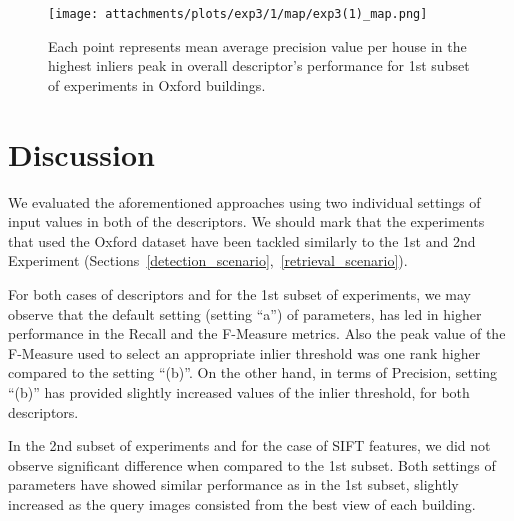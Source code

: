 	    \begin{figure}[H]
		\centering
		\texttt{[image: attachments/plots/exp3/1/map/exp3(1)\_map.png]}
		\caption{Each point represents mean average precision value per house in the highest inliers peak in overall descriptor's performance for 1st subset of experiments in Oxford buildings.}
		\label{fig:oxf_exp1_map}
	    \end{figure}

\section{Discussion}\label{exp_discussion}
We evaluated the aforementioned approaches using two individual settings of input values in both of the descriptors. We should mark that the experiments that used the Oxford dataset have been tackled similarly to the 1st and 2nd Experiment (Sections~\ref{detection_scenario},~\ref{retrieval_scenario}).

For both cases of descriptors and for the 1st subset of experiments, we may observe that the default setting (setting ``a'')  of parameters, has led in higher performance in the Recall  and the F-Measure metrics. Also the peak value of the F-Measure used to select an appropriate inlier threshold was one rank higher compared to the setting ``(b)''. On the other hand, in terms of Precision, setting ``(b)'' has provided slightly increased values of the inlier threshold, for both descriptors.

In the 2nd subset of experiments and for the case of SIFT features, we did not observe significant difference when compared to the 1st subset. Both settings of parameters have showed similar performance as in the 1st subset, slightly increased as the query images consisted from the best view of each building.
  

